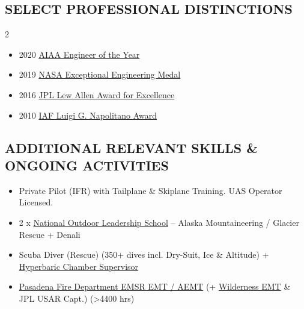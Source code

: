 \documentclass[11pt,letterpaper]{article}
\begin{document}
\subsection*{SELECT PROFESSIONAL DISTINCTIONS}
\begin{multicols}{2}
\begin{itemize}
\item 2020 \href{https://aiaa.org/awards/engineer-of-the-year-award/}{AIAA Engineer of the Year}
\item 2019 \href{https://en.wikipedia.org/wiki/NASA_Exceptional_Engineering_Achievement_Medal}{NASA Exceptional Engineering Medal}
\item 2016 \href{https://www.jpl.nasa.gov/site/research/research-community/awards-and-recognitions/lew-allen-award/}{JPL Lew Allen Award for Excellence}
\item 2010 \href{https://en.wikipedia.org/wiki/Luigi_G._Napolitano_Award#:~:text=on%20the%20contribution.-,The%20Luigi%20G.,Luigi%20Napolitano%20Book%20Award%20annually.}{IAF Luigi G. Napolitano Award}
\end{itemize}

\end{multicols}
\subsection*{ADDITIONAL RELEVANT SKILLS \& ONGOING ACTIVITIES}
\begin{itemize}
\item Private Pilot (IFR) with Tailplane \& Skiplane Training. UAS Operator Licensed.
\item 2 x \href{https://www.nols.edu/locations/nols-alaska/}{National Outdoor Leadership School} – Alaska Mountaineering / Glacier Rescue + Denali
\item Scuba Diver (Rescue) (350+ dives incl. Dry-Suit, Ice \& Altitude) + \href{https://dornsife.usc.edu/hyperbaric/}{Hyperbaric Chamber Supervisor}
\item \href{https://www.emsr.org/index.cfm}{Pasadena Fire Department EMSR EMT / AEMT} (+ \href{https://www.nols.edu/courses/wm/wilderness-emt-wemt/}{Wilderness EMT} \& JPL USAR Capt.) (>4400 hrs)
\end{itemize}
\end{document}
